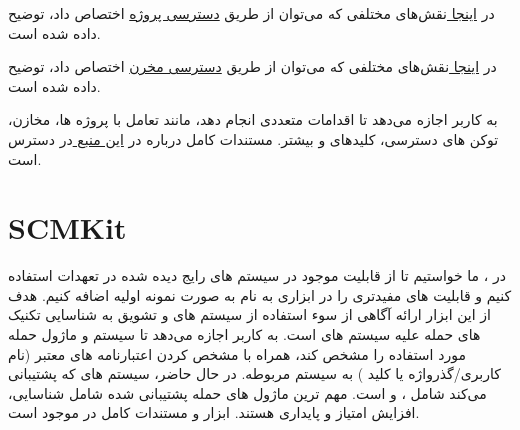\documentclass{CSICC}
\begin{document}
 	   در 
 	   \href{https://confluence.atlassian.com/bitbucketserver/using-project-permissions-776639801.html}{ اینجا
 	   }
 	   نقش‌های مختلفی که می‌توان از طریق \underline{دسترسی پروژه} اختصاص داد، توضیح داده شده است.
 	   
 	   
 	   در 
 	   \href{https://confluence.atlassian.com/bitbucketserver/using-repository-permissions-776639771.html}{ اینجا
 	   }
 	   نقش‌های مختلفی که می‌توان از طریق \underline{دسترسی مخرن} اختصاص داد، توضیح داده شده است.
 	   
 	   
 	   
 	   به کاربر اجازه می‌دهد تا اقدامات متعددی انجام دهد، مانند تعامل با پروژه‌ ها، مخازن، توکن ‌های دسترسی، کلیدهای
 	   و بیشتر. مستندات کامل درباره
 	   در
 	   \href{https://developer.atlassian.com/server/bitbucket/rest/v819/}{ این منبع
 	   }
 	   در دسترس است.
 \section{SCMKit}
 	در
 	 ، ما خواستیم تا از قابلیت
 	   موجود در سیستم‌ های
 	     رایج دیده شده در تعهدات استفاده کنیم و قابلیت ‌های مفیدتری را در ابزاری به نام
 	       به صورت نمونه اولیه اضافه کنیم. هدف از این ابزار ارائه آگاهی از سوء استفاده از سیستم‌ های
 	         و تشویق به شناسایی تکنیک ‌های حمله علیه سیستم ‌های 
 	         است.
 	 به کاربر اجازه می‌دهد تا سیستم
 	   و ماژول حمله مورد استفاده را مشخص کند، همراه با مشخص کردن اعتبارنامه‌ های معتبر (نام کاربری/گذرواژه یا کلید
 	    ) به سیستم
 	      مربوطه. در حال حاضر، سیستم‌ های
 	       که 
 	        پشتیبانی می‌کند شامل
 	        ،
 	          و
 	            است. مهم ترین ماژول‌ های حمله پشتیبانی شده شامل شناسایی، افزایش امتیاز و پایداری هستند. ابزار و مستندات کامل در
 	            \href{https://github.com/xforcered}{
 	            }
 	      موجود است.
 	      
\end{document}
